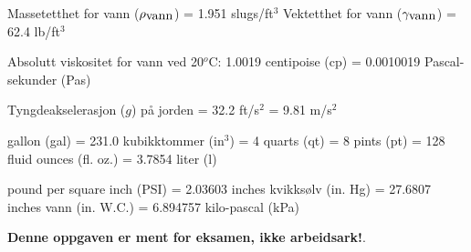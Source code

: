 \noindent
Massetetthet for vann ($\rho_{\hbox{vann}}$) = 1.951 slugs/ft$^{3}$ \hskip 50pt Vektetthet for vann ($\gamma_{\hbox{vann}}$) = 62.4 lb/ft$^{3}$

\vskip 10pt

\noindent
Absolutt viskositet for vann ved 20$^{o}$C: 1.0019 centipoise (cp) = 0.0010019 Pascal-sekunder (Pas)

\vskip 10pt

\noindent
Tyngdeakselerasjon ($g$) på jorden = 32.2 ft/s$^{2}$ = 9.81 m/s$^{2}$

\vskip 10pt

 gallon (gal) = 231.0 kubikktommer (in$^{3}$) = 4 quarts (qt) = 8 pints (pt) = 128 fluid ounces (fl. oz.) = 3.7854 liter (l)

\vskip 10pt

 pound per square inch (PSI) = 2.03603 inches kvikksølv (in. Hg) = 27.6807 inches vann (in. W.C.) = 6.894757 kilo-pascal (kPa)














{\bf Denne oppgaven er ment for eksamen, ikke arbeidsark!}.

